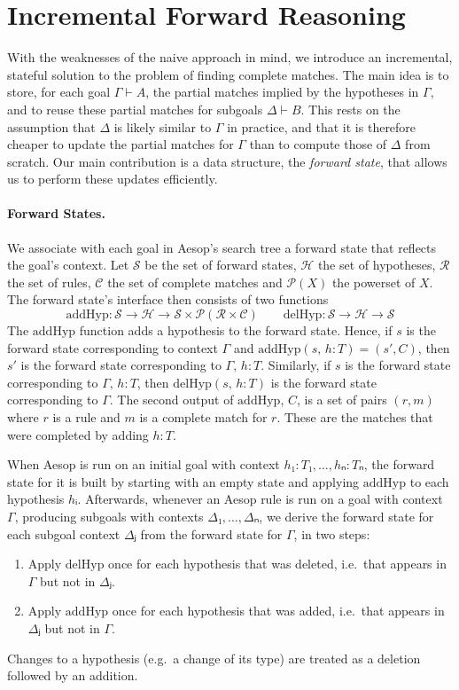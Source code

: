 \documentclass[runningheads,leqno]{llncs}
\newcommand{\para}[1]{\paragraph{\bfseries\upshape #1}}
\newcommand{\Rules}{\ensuremath{\mathcal{R}}}
\newcommand{\Hyps}{\ensuremath{\mathcal{H}}}
\newcommand{\States}{\ensuremath{\mathcal{S}}}
\newcommand{\CMatches}{\ensuremath{\mathcal{C}}}
\newcommand{\addHyp}{\ensuremath{\mathrm{addHyp}}}
\newcommand{\delHyp}{\ensuremath{\mathrm{delHyp}}}
\newcommand{\powerset}{\ensuremath{\mathcal{P}}}
\begin{document}
\section{Incremental Forward Reasoning}%
\label{sec:incremental}

With the weaknesses of the naive approach in mind, we introduce an incremental, stateful solution to the problem of finding complete matches.
The main idea is to store, for each goal $Γ ⊢ A$, the partial matches implied by the hypotheses in $Γ$, and to reuse these partial matches for subgoals $Δ ⊢ B$.
This rests on the assumption that $Δ$ is likely similar to $Γ$ in practice, and that it is therefore cheaper to update the partial matches for $Γ$ than to compute those of $Δ$ from scratch.
Our main contribution is a data structure, the \emph{forward state}, that allows us to perform these updates efficiently.

\para{Forward States.}
We associate with each goal in Aesop's search tree a forward state that reflects the goal's context.
Let $\States$ be the set of forward states, $\Hyps$ the set of hypotheses, $\Rules$ the set of rules, $\CMatches$ the set of complete matches and $\powerset(X)$ the powerset of $X$.
The forward state's interface then consists of two functions
\[
  \addHyp : \States → \Hyps → \States × \powerset(\Rules × \CMatches) \qquad \delHyp : \States → \Hyps → \States
\]
The $\addHyp$ function adds a hypothesis to the forward state.
Hence, if $s$ is the forward state corresponding to context $Γ$ and $\addHyp(s,\, h : T) = (s', C)$, then $s'$ is the forward state corresponding to $Γ,\, h : T$.
Similarly, if $s$ is the forward state corresponding to $Γ,\, h : T$, then $\delHyp(s,\, h : T)$ is the forward state corresponding to $Γ$.
The second output of $\addHyp$, $C$, is a set of pairs $(r, m)$ where $r$ is a rule and $m$ is a complete match for $r$.
These are the matches that were completed by adding $h : T$.

When Aesop is run on an initial goal with context $h₁ : T₁, \dots, hₙ : Tₙ$, the forward state for it is built by starting with an empty state and applying $\addHyp$ to each hypothesis $hᵢ$.
Afterwards, whenever an Aesop rule is run on a goal with context $Γ$, producing subgoals with contexts $Δ₁, \dots, Δₙ$, we derive the forward state for each subgoal context $Δⱼ$ from the forward state for $Γ$, in two steps:
\begin{enumerate}
  \item Apply $\delHyp$ once for each hypothesis that was deleted, i.e.\ that appears in $Γ$ but not in $Δⱼ$.
  \item Apply $\addHyp$ once for each hypothesis that was added, i.e.\ that appears in $Δⱼ$ but not in $Γ$.
\end{enumerate}
Changes to a hypothesis (e.g.\ a change of its type) are treated as a deletion followed by an addition.
\end{document}
